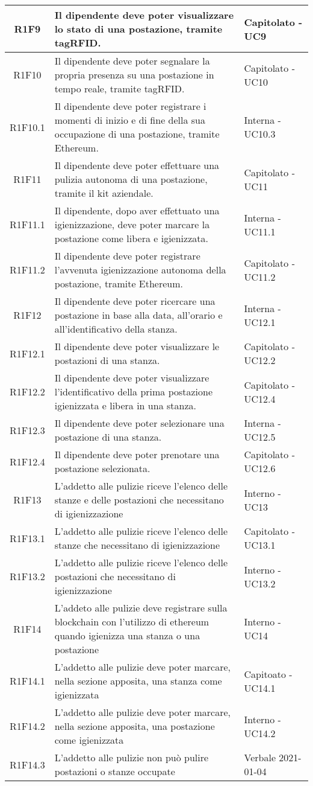 \begin{center}
\begin{longtable}{|c|p{10cm}|p{4cm}|}
					\hline
					R1F9&Il dipendente deve poter visualizzare lo stato di una postazione, tramite tagRFID.	&Capitolato - UC9 	\\
					\hline
			R1F10&Il dipendente deve poter segnalare la propria presenza su una postazione in tempo reale, tramite tagRFID.	&Capitolato - UC10 	\\
		\hline
		R1F10.1&Il dipendente deve poter registrare i momenti di inizio e di fine della sua occupazione di una postazione, tramite Ethereum.	&Interna - UC10.3 	\\
		\hline	
		R1F11&Il dipendente deve poter effettuare una pulizia autonoma di una postazione, tramite il kit aziendale.	&Capitolato - UC11	\\
		\hline		
		R1F11.1&Il dipendente, dopo aver effettuato una igienizzazione, deve poter marcare la postazione come libera e igienizzata.	&Interna - UC11.1	\\
		\hline	
		R1F11.2&Il dipendente deve poter registrare l'avvenuta igienizzazione autonoma della postazione, tramite Ethereum.	&Capitolato - UC11.2	\\
		\hline	
		R1F12&Il dipendente deve poter ricercare una postazione in base alla data, all'orario e all'identificativo della stanza.	&Interna - UC12.1	\\
		\hline
		R1F12.1&Il dipendente deve poter visualizzare le postazioni di una stanza.	&Capitolato - UC12.2	\\
		\hline
		R1F12.2&Il dipendente deve poter visualizzare l'identificativo della prima postazione igienizzata e libera in una stanza.	&Capitolato - UC12.4	\\
		\hline
		R1F12.3&Il dipendente deve poter selezionare una postazione di una stanza.	&Interna - UC12.5	\\
		\hline
		R1F12.4&Il dipendente deve poter prenotare una postazione selezionata.	&Capitolato - UC12.6	\\
		\hline
R1F13&L'addetto alle pulizie riceve l'elenco delle stanze e delle postazioni che necessitano di igienizzazione	& Interno - UC13	\\
						\hline
			R1F13.1&	L'addetto alle pulizie riceve l'elenco delle stanze che necessitano di igienizzazione& 	Capitolato - UC13.1\\
					\hline
			R1F13.2&L'addetto alle pulizie riceve l'elenco delle postazioni che necessitano di igienizzazione	& Interno - UC13.2	\\
					\hline
R1F14&L'addeto alle pulizie deve registrare sulla blockchain con l'utilizzo di ethereum quando igienizza una stanza o una postazione	& Interno - UC14	\\
					\hline
R1F14.1&L'addetto alle pulizie deve poter marcare, nella sezione apposita, una stanza come igienizzata	& Capitoato - UC14.1	\\
						\hline
			R1F14.2&L'addetto alle pulizie deve poter marcare, nella sezione apposita, una postazione come igienizzata	&Interno - UC14.2 	\\
					\hline
			R1F14.3&L'addetto alle pulizie non può pulire postazioni o stanze occupate	& Verbale 2021-01-04	\\
					\hline
						

\end{longtable}
\end{center}
